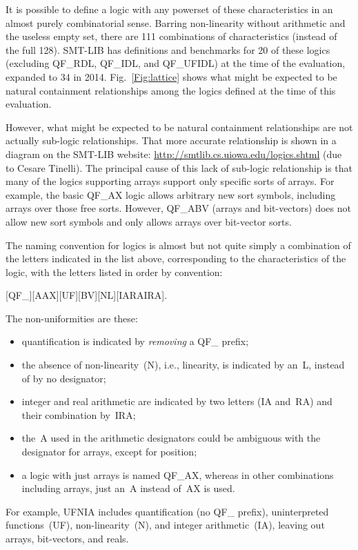 \documentclass[smallcondensed]{svjour3}
\begin{document}
It is possible to define a logic with any powerset of these characteristics in an almost purely combinatorial sense. 
Barring non-linearity without arithmetic and the useless empty set, there are 111 combinations of characteristics (instead of the full 128). SMT-LIB has definitions and benchmarks for 20 of these logics (excluding QF\_RDL, QF\_IDL, and QF\_UFIDL) at the time of the evaluation, expanded to 34 in 2014. Fig.~\ref{Fig:lattice} shows what might be expected to be natural containment relationships among the logics defined at the time of this evaluation. 

However, what might be expected to be natural containment relationships are not actually sub-logic relationships. That more accurate relationship is shown in a diagram on the SMT-LIB website: \url{http://smtlib.cs.uiowa.edu/logics.shtml} (due to Cesare Tinelli). The principal cause of this lack of sub-logic relationship is that many of the logics supporting arrays support only specific sorts of arrays. For example, the basic QF\_AX logic allows arbitrary new sort symbols, including arrays over those free sorts. However, QF\_ABV (arrays and bit-vectors) does not allow new sort symbols and only allows arrays over bit-vector sorts.

The naming convention for logics is almost but not quite simply a combination of the letters indicated in the list above,
corresponding to the characteristics of the logic, with the letters listed in order by convention:
\begin{center}
[QF\_][A\textbar AX][UF][BV][N\textbar L][IA\textbar RA\textbar IRA].
\end{center}

\noindent The non-uniformities are these:
\begin{itemize}[noitemsep,nolistsep]
\item quantification is indicated by {\em removing} a QF\_ prefix;
\item the absence of non-linearity~(N), i.e., linearity, is indicated by an~L, instead of by no designator;
\item integer and real arithmetic are indicated by two letters (IA and~RA) and their combination by~IRA;
\item the~A used in the arithmetic designators could be ambiguous with the designator for arrays, except for position;
\item a logic with just arrays is named QF\_AX, whereas in other combinations including arrays, just an~A instead of~AX is used.
\end{itemize}
For example, UFNIA includes quantification (no QF\_ prefix), uninterpreted functions~(UF), non-linearity~(N), and integer arithmetic~(IA), leaving out arrays, bit-vectors, and reals.
\end{document}
